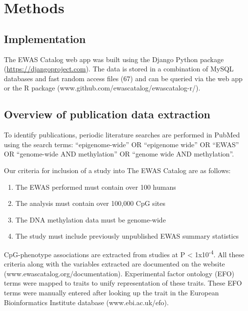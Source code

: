 \documentclass[11pt,oneside]{bristolthesis}
\providecommand{\tightlist}{%
  \setlength{\itemsep}{0pt}\setlength{\parskip}{0pt}}
\begin{document}
\hypertarget{methods-03}{%
\section{Methods}\label{methods-03}}

\hypertarget{implementation}{%
\subsection{Implementation}\label{implementation}}

The EWAS Catalog web app was built using the Django Python package (\url{https://djangoproject.com}). The data is stored in a combination of MySQL databases and fast random access files (67) and can be queried via the web app or the R package (www.github.com/ewascatalog/ewascatalog-r/).

\hypertarget{overview-of-publication-data-extraction}{%
\subsection{Overview of publication data extraction}\label{overview-of-publication-data-extraction}}

To identify publications, periodic literature searches are performed in PubMed using the search terms: ``epigenome-wide'' OR ``epigenome wide'' OR ``EWAS'' OR ``genome-wide AND methylation'' OR ``genome wide AND methylation''.

Our criteria for inclusion of a study into The EWAS Catalog are as follows:
\begin{enumerate}
\def\labelenumi{\arabic{enumi}.}
\tightlist
\item
  The EWAS performed must contain over 100 humans
\item
  The analysis must contain over 100,000 CpG sites
\item
  The DNA methylation data must be genome-wide
\item
  The study must include previously unpublished EWAS summary statistics
\end{enumerate}
CpG-phenotype associations are extracted from studies at P \textless{} 1x10\textsuperscript{-4}. All these criteria along with the variables extracted are documented on the website (www.ewascatalog.org/documentation). Experimental factor ontology (EFO) terms were mapped to traits to unify representation of these traits. These EFO terms were manually entered after looking up the trait in the European Bioinformatics Institute database (www.ebi.ac.uk/efo).
\end{document}
